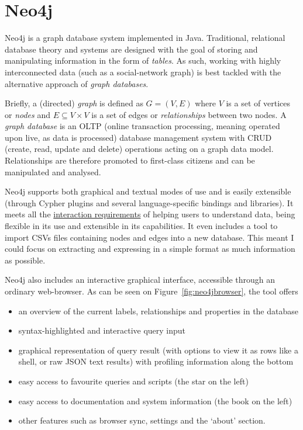 \section{Neo4j}\label{sec:neo4j}

Neo4j is a graph database system implemented in Java. Traditional, relational
database theory and systems are designed with the goal of storing and
manipulating information in the form of \emph{tables}. As such, working with
highly interconnected data (such as a social-network graph) is best tackled with
the alternative approach of \emph{graph databases}.

Briefly, a (directed) \emph{graph} is defined as $G = (V, E)$ where $V$ is a set
of vertices or \emph{nodes} and $E \subseteq V \times V$ is a set of edges or
\emph{relationships} between two nodes. A \emph{graph database} is an OLTP
(online transaction processing, meaning operated upon live, as data is
processed) database management system with CRUD (create, read, update and delete)
operations acting on a graph data model. Relationships are therefore promoted to
first-class citizens and can be manipulated and analysed.

Neo4j supports both graphical and textual modes of use and is easily extensible
(through Cypher plugins and several language-specific bindings and libraries).
It meets all the \hyperref[req:i1]{interaction requirements} of helping users to
understand data, being flexible in its use and extensible in its capabilities.
It even includes a tool to import CSVs files containing nodes and edges into a
new database. This meant I could focus on extracting and expressing in a simple
format as much information as possible.

Neo4j also includes an interactive graphical interface, accessible through an
ordinary web-browser. As can be seen on Figure~\ref{fig:neo4jbrowser}, the tool
offers
\begin{itemize}
  \item an overview of the current labels, relationships and properties in the
        database
  \item syntax-highlighted and interactive query input
  \item graphical representation of query result (with options to view it as
        rows like a shell, or raw JSON text results) with profiling information
        along the bottom
  \item easy access to favourite queries and scripts (the star on the left)
  \item easy access to documentation and system information (the book on the
        left)
  \item other features such as browser sync, settings and the `about' section.
\end{itemize}

